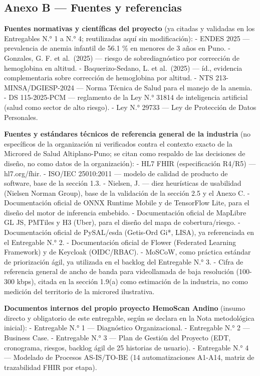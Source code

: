 \documentclass[11pt,a4paper]{article}
\begin{document}
\subsection{Anexo B --- Fuentes y referencias}\label{anexo-b-fuentes-y-referencias}

\textbf{Fuentes normativas y científicas del proyecto} (ya citadas y validadas en los Entregables N.° 1 a N.° 4; reutilizadas aquí sin modificación):
- ENDES 2025 --- prevalencia de anemia infantil de 56.1 \% en menores de 3 años en Puno.
- Gonzales, G. F. et al.~(2025) --- riesgo de sobrediagnóstico por corrección de hemoglobina en altitud.
- Baquerizo-Sedano, L. et al.~(2025) --- íd., evidencia complementaria sobre corrección de hemoglobina por altitud.
- NTS 213-MINSA/DGIESP-2024 --- Norma Técnica de Salud para el manejo de la anemia.
- DS 115-2025-PCM --- reglamento de la Ley N.° 31814 de inteligencia artificial (salud como sector de alto riesgo).
- Ley N.° 29733 --- Ley de Protección de Datos Personales.

\textbf{Fuentes y estándares técnicos de referencia general de la industria} (no específicos de la organización ni verificados contra el contexto exacto de la Microred de Salud Altiplano-Puno; se citan como respaldo de las decisiones de diseño, no como datos de la organización):
- HL7 FHIR (especificación R4/R5) --- hl7.org/fhir.
- ISO/IEC 25010:2011 --- modelo de calidad de producto de software, base de la sección 1.3.
- Nielsen, J. --- diez heurísticas de usabilidad (Nielsen Norman Group), base de la validación de la sección 2.5 y el Anexo C.
- Documentación oficial de ONNX Runtime Mobile y de TensorFlow Lite, para el diseño del motor de inferencia embebido.
- Documentación oficial de MapLibre GL JS, PMTiles y H3 (Uber), para el diseño del mapa de cobertura/riesgo.
- Documentación oficial de PySAL/esda (Getis-Ord Gi*, LISA), ya referenciada en el Entregable N.° 2.
- Documentación oficial de Flower (Federated Learning Framework) y de Keycloak (OIDC/RBAC).
- MoSCoW, como práctica estándar de priorización ágil, ya utilizada en el backlog del Entregable N.° 3.
- Cifra de referencia general de ancho de banda para videollamada de baja resolución (100-300 kbps), citada en la sección 1.9(a) como estimación de la industria, no como medición del territorio de la microred ilustrativa.

\textbf{Documentos internos del propio proyecto HemoScan Andino} (insumo directo y obligatorio de este entregable, según se declara en la Nota metodológica inicial):
- Entregable N.° 1 --- Diagnóstico Organizacional.
- Entregable N.° 2 --- Business Case.
- Entregable N.° 3 --- Plan de Gestión del Proyecto (EDT, cronograma, riesgos, backlog ágil de 25 historias de usuario).
- Entregable N.° 4 --- Modelado de Procesos AS-IS/TO-BE (14 automatizaciones A1-A14, matriz de trazabilidad FHIR por etapa).
\end{document}
